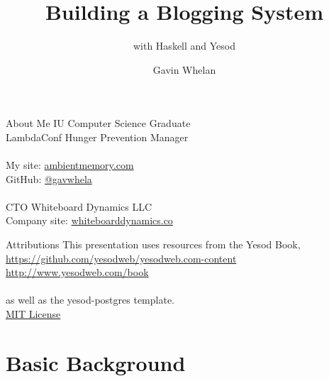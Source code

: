 \documentclass[pdf]{beamer}
\title{Building a Blogging System}
\subtitle{with Haskell and Yesod}
\author{Gavin Whelan}
\begin{document}
\begin{frame}
  \titlepage
\end{frame}

\begin{frame}{About Me}
  IU Computer Science Graduate\\
  LambdaConf Hunger Prevention Manager\\
  \\
  My site: \href{https://ambientmemory.com}{ambientmemory.com}\\
  GitHub: \href{https://github.com/gavwhela}{@gavwhela}\\
  \\
  CTO Whiteboard Dynamics LLC\\
  Company site: \href{https://whiteboarddynamics.co}{whiteboarddynamics.co}\\
\end{frame}

\begin{frame}{Attributions}
  This presentation uses resources from the Yesod Book,\\
  \url{https://github.com/yesodweb/yesodweb.com-content}\\
  \url{http://www.yesodweb.com/book}\\
  \\
  as well as the yesod-postgres template.\\
  \href{https://github.com/commercialhaskell/stack-templates/blob/master/LICENSE}{MIT License}\\
\end{frame}

\section{Basic Background}
\end{document}
